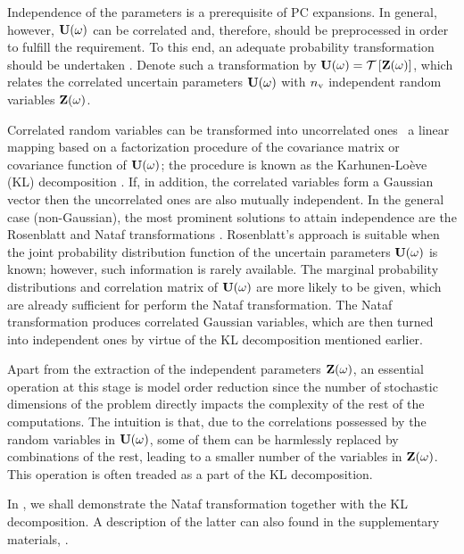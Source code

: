Independence of the parameters is a prerequisite of PC expansions.
In general, however, $\mathbf{U}(\omega)$ can be correlated and, therefore, should be preprocessed in order to fulfill the requirement.
To this end, an adequate probability transformation should be undertaken \cite{eldred2008}.
Denote such a transformation by $\vU(\o) = \oTransform{\vZ(\o)}$, which relates the correlated uncertain parameters $\mathbf{U}(\omega)$ with ${n_\text{v}}$ independent random variables $\mathbf{Z}(\omega)$.

Correlated random variables can be transformed into uncorrelated ones \via\ a linear mapping based on a factorization procedure of the covariance matrix or covariance function of $\mathbf{U}(\omega)$; the procedure is known as the Karhunen-Lo\`{e}ve (KL) decomposition \cite{ghanem1991}.
If, in addition, the correlated variables form a Gaussian vector then the uncorrelated ones are also mutually independent.
In the general case (non-Gaussian), the most prominent solutions to attain independence are the Rosenblatt \cite{rosenblatt1952} and Nataf transformations \cite{li2008}.
Rosenblatt's approach is suitable when the joint probability distribution function of the uncertain parameters $\mathbf{U}(\omega)$ is known; however, such information is rarely available.
The marginal probability distributions and correlation matrix of $\mathbf{U}(\omega)$ are more likely to be given, which are already sufficient for perform the Nataf transformation.
The Nataf transformation produces correlated Gaussian variables, which are then turned into independent ones by virtue of the KL decomposition mentioned earlier.

Apart from the extraction of the independent parameters $\mathbf{Z}(\omega)$, an essential operation at this stage is model order reduction since the number of stochastic dimensions of the problem directly impacts the complexity of the rest of the computations.
The intuition is that, due to the correlations possessed by the random variables in $\mathbf{U}(\omega)$, some of them can be harmlessly replaced by combinations of the rest, leading to a smaller number of the variables in $\mathbf{Z}(\omega)$.
This operation is often treaded as a part of the KL decomposition.

In , we shall demonstrate the Nataf transformation together with the KL decomposition.
A description of the latter can also found in the supplementary materials, .
